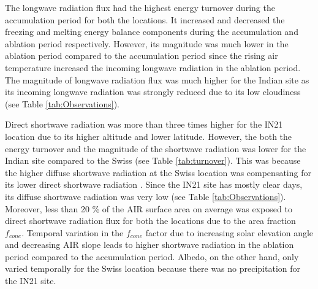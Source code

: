 \documentclass[utf8]{frontiersSCNS}
\begin{document}
The longwave radiation flux had the highest energy turnover during the accumulation period for both the
locations. It increased and decreased the freezing and melting energy balance components during the accumulation
and ablation period respectively. However, its magnitude was much lower in the ablation period compared to the
accumulation period since the rising air temperature increased the incoming longwave radiation in the ablation
period. The magnitude of longwave radiation flux was much higher for the Indian site as its incoming longwave
radiation was strongly reduced due to its low cloudiness (see Table \ref{tab:Observations}).

Direct shortwave radiation was more than three times higher for the IN21 location due to its higher altitude and
lower latitude. However, the both the energy turnover and the magnitude of the shortwave radiation was lower for
the Indian site compared to the Swiss (see Table \ref{tab:turnover}). This was because the higher diffuse
shortwave radiation at the Swiss location was compensating for its lower direct shortwave radiation . Since the
IN21 site has mostly clear days, its diffuse shortwave radiation was very low (see Table
\ref{tab:Observations}). Moreover, less than 20 \% of the AIR surface area on average was exposed to direct
shortwave radiation flux for both the locations due to the area fraction $f_{cone}$. Temporal variation in the
$f_{cone}$ factor due to increasing solar elevation angle and decreasing AIR slope leads to higher shortwave
radiation in the ablation period compared to the accumulation period. Albedo, on the other hand, only varied
temporally for the Swiss location because there was no precipitation for the IN21 site.
\end{document}
